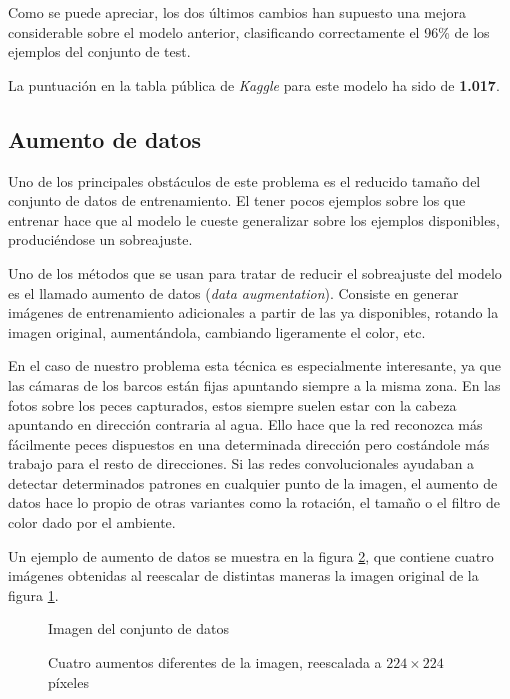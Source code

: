 Como se puede apreciar, los dos últimos cambios han supuesto una mejora considerable sobre el modelo anterior, clasificando correctamente el 96\% de los ejemplos del conjunto de test.

La puntuación en la tabla pública de \textit{Kaggle} para este modelo ha sido
de \textbf{1.017}.


\subsection{Aumento de datos}

Uno de los principales obstáculos de este problema es el reducido tamaño del conjunto de datos de entrenamiento. El tener pocos ejemplos sobre los que entrenar hace que al modelo le cueste generalizar sobre los ejemplos disponibles, produciéndose un sobreajuste.

Uno de los métodos que se usan para tratar de reducir el sobreajuste del modelo es el llamado aumento de datos (\textit{data augmentation}). Consiste en generar imágenes de entrenamiento adicionales a partir de las ya disponibles, rotando la imagen original, aumentándola, cambiando ligeramente el color, etc.

En el caso de nuestro problema esta técnica es especialmente interesante, ya que las cámaras de los barcos están fijas apuntando siempre a la misma zona. En las fotos sobre los peces capturados, estos siempre suelen estar con la cabeza apuntando en dirección contraria al agua. Ello hace que la red reconozca más fácilmente peces dispuestos en una determinada dirección pero costándole más trabajo para el resto de direcciones. Si las redes convolucionales ayudaban a detectar determinados patrones en cualquier punto de la imagen, el aumento de datos hace lo propio de otras variantes como la rotación, el tamaño o el filtro de color dado por el ambiente.

Un ejemplo de aumento de datos se muestra en la figura \ref{augmentations}, que contiene cuatro imágenes obtenidas al reescalar de distintas maneras la imagen original de la figura \ref{aug-original}.

\begin{figure}
    \caption{Imagen del conjunto de datos}
\label{aug-original}
\end{figure}

\begin{figure}
    \caption{Cuatro aumentos diferentes de la imagen, reescalada a $224\times224$ píxeles}
\label{augmentations}
  \makebox[\textwidth]{\texttt{[image: au1]}}
  \makebox[\textwidth]{\texttt{[image: au3]}}
  \makebox[\textwidth]{\texttt{[image: au2]}}
  \makebox[\textwidth]{\texttt{[image: au4]}}
\end{figure}

